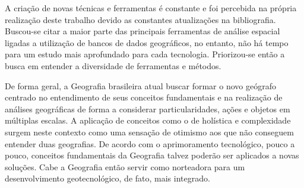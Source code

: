 A criação de novas técnicas e ferramentas é constante e foi percebida na própria realização deste trabalho devido as constantes atualizações na bibliografia. Buscou-se citar a maior parte das principais ferramentas de análise espacial ligadas a utilização de bancos de dados geográficos, no entanto, não há tempo para um estudo mais aprofundado para cada tecnologia. Priorizou-se então a busca em entender a diversidade de ferramentas e métodos.

De forma geral, a Geografia brasileira atual buscar formar o novo geógrafo centrado no entendimento de seus conceitos fundamentais e na realização de análises geográficas de forma a considerar particularidades, ações e objetos em múltiplas escalas. A aplicação de conceitos como o de holística e complexidade surgem neste contexto como uma sensação de otimismo aos que não conseguem entender duas geografias. De acordo com o aprimoramento tecnológico, pouco a pouco, conceitos fundamentais da Geografia talvez poderão ser aplicados a novas soluções. Cabe a Geografia então servir como norteadora para um desenvolvimento geotecnológico, de fato, mais integrado.